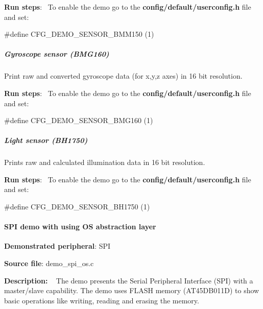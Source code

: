 \begin{DoxyItemize}
\item {\bfseries Run steps}\+:~\newline
 To enable the demo go to the {\bfseries {\ttfamily config/default/userconfig.\+h}} file and set\+: 
\begin{DoxyCode}
\textcolor{preprocessor}{#define CFG\_DEMO\_SENSOR\_BMM150       (1)}
\end{DoxyCode}

\end{DoxyItemize}

\subparagraph*{Gyroscope sensor (B\+M\+G160)}

Print raw and converted gyroscope data (for x,y,z axes) in 16 bit resolution.


\begin{DoxyItemize}
\item {\bfseries Run steps}\+:~\newline
 To enable the demo go to the {\bfseries {\ttfamily config/default/userconfig.\+h}} file and set\+: 
\begin{DoxyCode}
\textcolor{preprocessor}{#define CFG\_DEMO\_SENSOR\_BMG160       (1)}
\end{DoxyCode}

\end{DoxyItemize}

\subparagraph*{Light sensor (B\+H1750)}

Prints raw and calculated illumination data in 16 bit resolution.


\begin{DoxyItemize}
\item {\bfseries Run steps}\+:~\newline
 To enable the demo go to the {\bfseries {\ttfamily config/default/userconfig.\+h}} file and set\+: 
\begin{DoxyCode}
\textcolor{preprocessor}{#define CFG\_DEMO\_SENSOR\_BH1750       (1)}
\end{DoxyCode}

\end{DoxyItemize}

\paragraph*{S\+P\+I demo with using O\+S abstraction layer}


\begin{DoxyItemize}
\item {\bfseries Demonstrated peripheral}\+: S\+P\+I
\item {\bfseries Source file}\+: demo\+\_\+spi\+\_\+os.\+c
\item {\bfseries Description\+:} ~\newline
 The demo presents the Serial Peripheral Interface (S\+P\+I) with a master/slave capability. The demo uses F\+L\+A\+S\+H memory (A\+T45\+D\+B011\+D) to show basic operations like writing, reading and erasing the memory.
\end{DoxyItemize}

